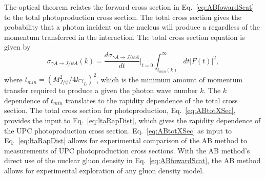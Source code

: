     The optical theorem relates the forward cross section in 
      Eq.~\ref{eq:ABfowardScat} to the total photoproduction cross section. 
    The total cross section gives the probability that a photon incident on 
      the nucleus will produce a \JPsi{} regardless of the momentum transferred 
      in the interaction. 
    The total cross section equation is given by
    \begin{equation} \label{eq:ABtotXSec}
      \sigma_{\gamma A\rightarrow J/\psi A}(k)=
      \frac{d\sigma_{\gamma A\rightarrow J/\psi A}}{dt}\Big|_{t=0}
      \int_{t_{min}(k)}^{\infty}dt|F(t)|^{2},
    \end{equation} 
      where $t_{min}=(M_{J/\psi}^{2}/4k\gamma_{L})^2$, which is the minimum 
      amount of momentum transfer required to produce a \JPsi{} 
      given the photon wave number $k$.
    The $k$ dependence of $t_{min}$ translates to the rapidity 
      dependence of the total cross section.
    The total cross section for photoproduction, Eq.~\ref{eq:ABtotXSec}, 
      provides the input to Eq.~\ref{eq:ltaRapDist}, 
      which gives the rapidity dependence of the UPC photoproduction cross 
      section. 
    Eq.~\ref{eq:ABtotXSec} as input to Eq.~\ref{eq:ltaRapDist} allows for 
      experimental comparison of the AB method to measurements of UPC 
      photoproduction cross sections. 
    With the AB method's direct use of the nuclear gluon density in 
      Eq.~\ref{eq:ABfowardScat}, the AB method allows for experimental 
      exploration of any gluon density model. 
      
